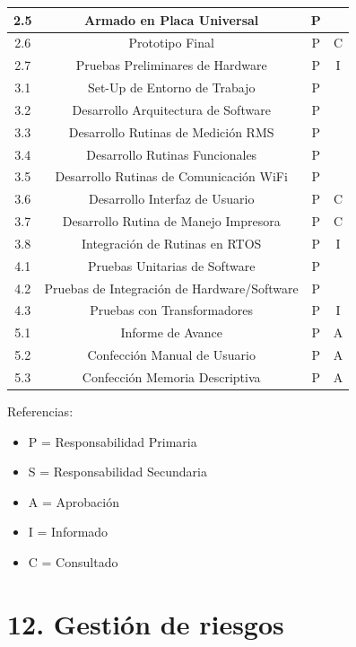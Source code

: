 \documentclass[11pt]{charter}
\begin{document}
\begin{table}[htpb]
{\begin{tabular}{|c|c|c|c|}
2.5 & Armado en Placa Universal               & P &   \\ \hline
2.6 & Prototipo Final                         & P & C \\ \hline
2.7 & Pruebas Preliminares de Hardware        & P & I \\ \hline
3.1 & Set-Up de Entorno de Trabajo            & P &   \\ \hline
3.2 & Desarrollo Arquitectura de Software     & P &   \\ \hline
3.3 & Desarrollo Rutinas de Medición RMS      & P &   \\ \hline
3.4 & Desarrollo Rutinas Funcionales          & P &   \\ \hline
3.5 & Desarrollo Rutinas de Comunicación WiFi & P &   \\ \hline
3.6 & Desarrollo Interfaz de Usuario          & P & C \\ \hline
3.7 & Desarrollo Rutina de Manejo Impresora   & P & C \\ \hline
3.8 & Integración de Rutinas en RTOS          & P & I \\ \hline
4.1 & Pruebas Unitarias de Software           & P &   \\ \hline
4.2 & Pruebas de Integración de Hardware/Software & P & \\ \hline
4.3 & Pruebas con Transformadores             & P & I \\ \hline
5.1 & Informe de Avance                       & P & A \\ \hline
5.2 & Confección Manual de Usuario            & P & A \\ \hline
5.3 & Confección Memoria Descriptiva          & P & A \\ \hline
\end{tabular}%
}
\end{table}


{\footnotesize
Referencias:
\begin{itemize}
	\item P = Responsabilidad Primaria
	\item S = Responsabilidad Secundaria
	\item A = Aprobación
	\item I = Informado
	\item C = Consultado
\end{itemize}
} %


\section{12. Gestión de riesgos}
\label{sec:riesgos}
\end{document}

